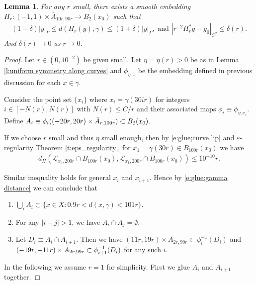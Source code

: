 \documentclass[11pt,reqno]{amsart}
\numberwithin{equation}{section}
\newcommand{\cL}{\mathcal{L}}
\newtheorem{lemma}[thm]{Lemma}
\theoremstyle{definition}
\theoremstyle{remark}
\begin{document}
\begin{lemma}\label{l:Horizontal Gluing}
For any $r$ small, there exists a smooth embedding $H_r:(-1,1) \times \bar{A}_{10r,90r} \to B_2(x_0)$ such that
\begin{align}\label{e:Horizontal gluing}
    (1- \delta) |y|_{\Gamma} \leqslant d(H_r(y), \gamma) \leqslant (1+\delta) |y|_{\Gamma}, \text{ and } |r^{-2} H_r^{*} g  - g_0|_{C^2} \leqslant \delta(r).
\end{align}
And $\delta(r) \to 0$ as $r \to 0$. 
\end{lemma}

\begin{proof}
    Let $r \in (0, 10^{-2})$ be given small. Let $\eta=\eta(r)>0$ be as in Lemma \ref{l:uniform symmetry along curves} and $\phi_{\eta,x}$ be the embedding defined in previous discussion for each $x \in \gamma$.

    Consider the point set $\{ x_i\}$ where $ x_i = \gamma(30 i r )$ for integers $i \in [-N(r), N(r)]$ with $N(r) \leqslant C/r$ and their associated maps $\phi_i \equiv \phi_{\eta, x_i}$. Define
    $A_i \equiv \phi_i( (-20r, 20r) \times {\Bar{A}}_{r, 100r}) \subset B_2(x_0).$ 

    If we choose $r$ small and thus $\eta$ small enough, then by \eqref{e:glue;curve lip} and $\varepsilon$-regularity Theorem \ref{t:eps_regularity}, for $x_1 = \gamma(30r)\in B_{100r}(x_0)$ we have
    \begin{align*}
        d_{H}(\cL_{x_0,200r} \cap B_{100r}(x_0), \cL_{x_1, 200 r}\cap B_{100 r}(x_0)) \leqslant  10^{-10} r.
    \end{align*}

    Similar inequality holds for general $x_i$ and $x_{i+1}$. Hence by \eqref{e:glue;gamma distance} we can conclude that
    \begin{enumerate}
        \item $\bigcup_i A_i \subset \big\{ x \in X: 0.9r< d(x, \gamma) < 101r\big\}.$ 
        \item For any $|i - j| > 1$, we have $A_i \cap A_j = \emptyset$.
        \item Let $D_i \equiv A_i \cap A_{i+1}$. Then we have $(11 r,19r) \times \bar{A}_{2r,99r} \subset \phi_i^{-1}(D_i)$ and $(-19r, -11r) \times \Bar{A}_{2r,99r} \subset \phi^{-1}_{i+1}(D_i)$ for any such $i$. 
    \end{enumerate}

In the following we assume $r=1$ for simplicity. First we glue $A_i$ and $A_{i+1}$ together.


\end{proof}
\end{document}
